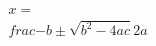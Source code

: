 \documentclass[preview]{standalone}
\begin{document}
\begin{align*}
x = \\frac{-b\pm\sqrt{b^2-4ac}}{2a}
\end{align*}
\end{document}
